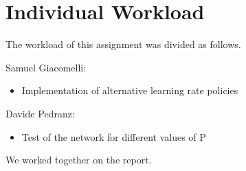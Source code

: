 \section{Individual Workload}
The workload of this assignment was divided as follows.

Samuel Giacomelli:
\begin{itemize}
    \item Implementation of alternative learning rate policies
\end{itemize}

Davide Pedranz:
\begin{itemize}
    \item Test of the network for different values of P
\end{itemize}

We worked together on the report.
